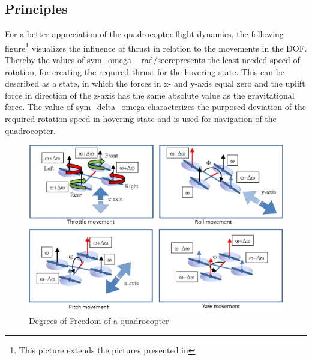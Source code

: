 \subsection{Principles}
For a better appreciation of the quadrocopter flight dynamics, the following
figure\footnote{This picture extends the pictures presented in} visualizes the influence of thrust in relation to the
movements in the \gls{DOF}. Thereby the values of \gls{sym_omega} ~\lbrack
rad/sec\rbrack represents the least needed speed of rotation, for creating the
required thrust for the hovering state. This can be described as a state,
in which the forces in x- and y-axis equal zero and the uplift force in
direction of the z-axis has the same absolute value as the gravitational force.
\newpage
The value of \gls{sym_delta_omega} characterizes the purposed
deviation of the required rotation speed in hovering state and is used for navigation of the
 quadrocopter.


\begin{figure}[H]
	\centering
		\includegraphics[width=1\textwidth]{graphic/QuadrotoDOF.png}
	\caption{Degrees of Freedom of a quadrocopter}
	\label{fig:quadrotoDOF}
\end{figure}


